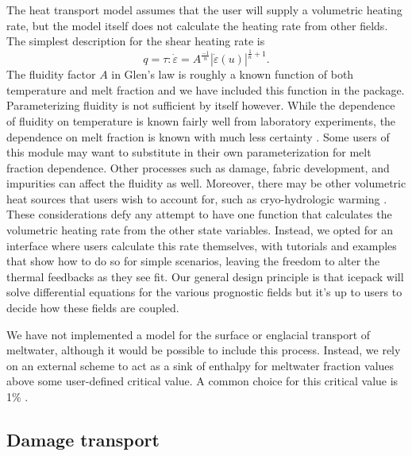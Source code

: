 \documentclass[journal abbreviation, manuscript]{copernicus}
\begin{document}
The heat transport model assumes that the user will supply a volumetric heating rate, but the model itself does not calculate the heating rate from other fields.
The simplest description for the shear heating rate is
\begin{equation}
    q = \tau : \dot\varepsilon = A^{\frac{-1}{n}}|\dot\varepsilon(u)|^{\frac{1}{n} + 1}.
\end{equation}
The fluidity factor $A$ in Glen's law is roughly a known function of both temperature and melt fraction and we have included this function in the package.
Parameterizing fluidity is not sufficient by itself however.
While the dependence of fluidity on temperature is known fairly well from laboratory experiments, the dependence on melt fraction is known with much less certainty \citep{cuffey2010physics}.
Some users of this module may want to substitute in their own parameterization for melt fraction dependence.
Other processes such as damage, fabric development, and impurities can affect the fluidity as well.
Moreover, there may be other volumetric heat sources that users wish to account for, such as cryo-hydrologic warming \citep{phillips2010cryo}.
These considerations defy any attempt to have one function that calculates the volumetric heating rate from the other state variables.
Instead, we opted for an interface where users calculate this rate themselves, with tutorials and examples that show how to do so for simple scenarios, leaving the freedom to alter the thermal feedbacks as they see fit.
Our general design principle is that icepack will solve differential equations for the various prognostic fields but it's up to users to decide how these fields are coupled.

We have not implemented a model for the surface or englacial transport of meltwater, although it would be possible to include this process.
Instead, we rely on an external scheme to act as a sink of enthalpy for meltwater fraction values above some user-defined critical value.
A common choice for this critical value is 1\% \citep{aschwanden2012enthalpy}.

\subsection{Damage transport} \label{sec:damage-transport}
\end{document}
